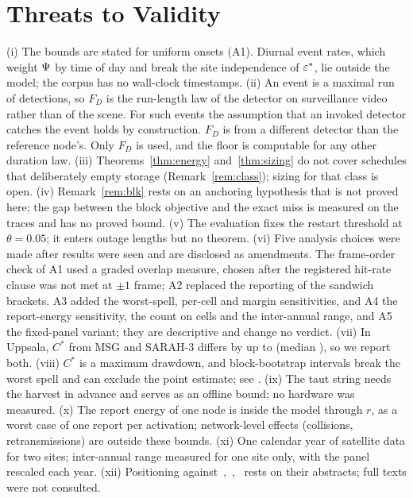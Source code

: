 \section{Threats to Validity}\label{sec:threats}
(i) The bounds are stated for uniform onsets (A1). Diurnal event rates, which weight $\Psi$ by time of day and break the site independence of $\varepsilon^*$, lie outside the model; the corpus has no wall-clock timestamps. (ii) An event is a maximal run of detections, so $F_D$ is the run-length law of the detector on surveillance video rather than of the scene. For such events the assumption that an invoked detector catches the event holds by construction. $F_D$ is from a different detector than the reference node's. Only $F_D$ is used, and the floor is computable for any other duration law. (iii) Theorems~\ref{thm:energy} and~\ref{thm:sizing} do not cover schedules that deliberately empty storage (Remark~\ref{rem:class}); sizing for that class is open. (iv) Remark~\ref{rem:blk} rests on an anchoring hypothesis that is not proved here; the gap between the block objective and the exact miss is measured on the traces and has no proved bound. (v) The evaluation fixes the restart threshold at $\theta=0.05$; it enters outage lengths but no theorem. (vi) Five analysis choices were made after results were seen and are disclosed as amendments. The frame-order check of A1 used a graded overlap measure, chosen after the registered hit-rate clause was not met at $\pm1$ frame; A2 replaced the reporting of the sandwich brackets. A3 added the worst-spell, per-cell and margin sensitivities, and A4 the report-energy sensitivity, the count on \nCellsSS{} cells and the inter-annual range, and A5 the fixed-panel variant; they are descriptive and change no verdict. (vii) In Uppsala, $C^*$ from MSG and SARAH-3 differs by up to \uppProdDiffMax{} (median \uppProdDiffMed), so we report both. (viii) $C^*$ is a maximum drawdown, and block-bootstrap intervals break the worst spell and can exclude the point estimate; see \blockNote. (ix) The taut string needs the harvest in advance and serves as an offline bound; no hardware was measured. (x) The report energy of one node is inside the model through $r$, as a worst case of one report per activation; network-level effects (collisions, retransmissions) are outside these bounds. (xi) One calendar year of satellite data for two sites; inter-annual range measured for one site only, with the panel rescaled each year. (xii) Positioning against~\cite{ren2014tpds},~\cite{ren2015p2p},~\cite{ballestrin2026cl} rests on their abstracts; full texts were not consulted.

